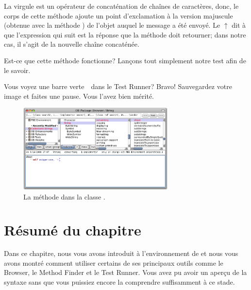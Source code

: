 \documentclass[a4paper,10pt,twoside]{book}
\begin{document}
La virgule est un opérateur de concaténation de chaînes de
caractères, donc, le corps de cette méthode ajoute un point
d'exclamation à la version majuscule
(obtenue avec la méthode )
de l'objet  auquel le message  a été
envoyé.
Le $\uparrow$ dit à \pharo que l'expression qui suit est la réponse
que la méthode doit retourner; dans notre cas, il s'agit de la
nouvelle chaîne concaténée.

Est-ce que cette méthode fonctionne? Lançons tout simplement
notre test afin de le savoir.

Vous voyez une barre verte~\footnotemark\ dans le Test Runner? Bravo!
Sauvegardez votre image et faites une pause. 
Vous l'avez bien mérité. 

\begin{figure}[hbt]
	{\centerline{\includegraphics[width=0.7\textwidth]{String-Shout}}}
\caption{La méthode  dans la classe .}
\end{figure}

\section{Résumé du chapitre}
Dans ce chapitre, nous vous avons introduit à l'environnement de
\pharo et nous vous avons montré comment utiliser certains de ses
principaux outils comme le   Browser, le
Method Finder et le Test Runner. Vous avez pu avoir un aperçu de la
syntaxe sans que vous puissiez encore la comprendre suffisamment à ce stade.
\end{document}
